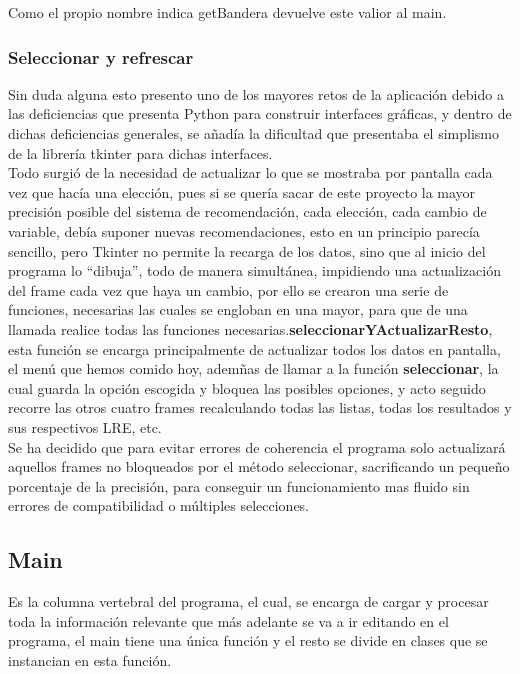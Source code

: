 Como el propio nombre indica getBandera devuelve este valior al main.\\

\subsubsection{Seleccionar y refrescar}
Sin duda alguna esto presento uno de los mayores retos de la aplicación debido a las deficiencias que presenta Python para construir interfaces gráficas, y dentro de dichas deficiencias generales, se añadía la dificultad que presentaba el simplismo de la librería tkinter para dichas interfaces.\\

Todo surgió de la necesidad de actualizar lo que se mostraba por pantalla cada vez que hacía una elección, pues si se quería sacar de este proyecto la mayor precisión posible del sistema de recomendación, cada elección, cada cambio de variable, debía suponer nuevas recomendaciones, esto en un principio parecía sencillo, pero Tkinter no permite la recarga de los datos, sino que al inicio del programa lo “dibuja”, todo de manera simultánea, impidiendo una actualización del frame cada vez que haya un cambio, por ello se crearon una serie de funciones, necesarias las cuales se engloban en una mayor, para que de una llamada realice todas las funciones necesarias.\textbf{seleccionarYActualizarResto}, esta función se encarga principalmente de actualizar todos los datos en pantalla, el menú que hemos comido hoy, ademñas de llamar a la función  \textbf{seleccionar}, la cual guarda la opción escogida y bloquea las posibles opciones, y acto seguido recorre las otros cuatro frames recalculando todas las listas, todas los resultados y sus respectivos LRE, etc. \\

Se ha decidido que para evitar errores de coherencia el programa solo actualizará aquellos frames no bloqueados por el método seleccionar, sacrificando un pequeño porcentaje de la precisión, para conseguir un funcionamiento mas fluido sin errores de compatibilidad o múltiples selecciones.\\
\subsection{Main}
Es la columna vertebral del programa, el cual, se encarga de cargar y procesar toda la información relevante que más adelante se va a ir editando en el programa, el main tiene una única función y el resto se divide en clases que se instancian en esta función.\\

